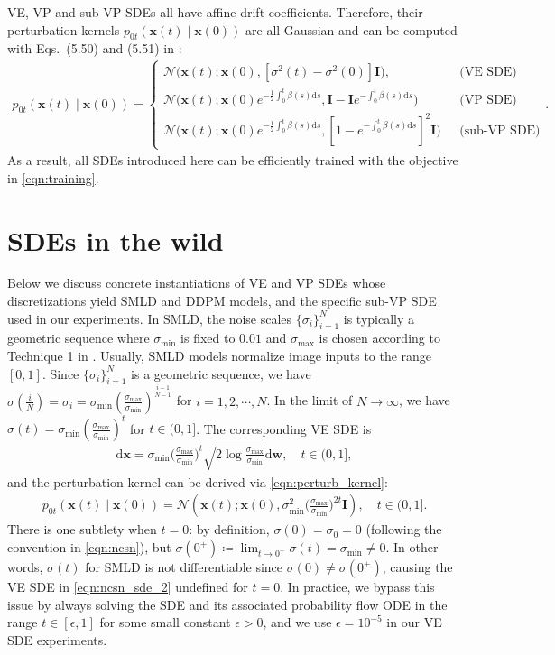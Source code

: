\documentclass{article} %
\newcommand{\ud}{\mathrm{d}}
\newcommand{\mcal}{\mathcal}
\newcommand{\bfx}{\mathbf{x}}
\newcommand{\bfw}{\mathbf{w}}
\newcommand{\bfI}{\mathbf{I}}
\newcommand{\sm}{\sigma_{\text{min}}}
\newcommand{\sM}{\sigma_{\text{max}}}
\begin{document}
VE, VP and sub-VP SDEs all have affine drift coefficients. Therefore, their perturbation kernels $p_{0t}(\bfx(t) \mid \bfx(0))$ are all Gaussian and can be computed with Eqs.~(5.50) and (5.51) in \citet{sarkka2019applied}:
\begin{align}
    p_{0t}(\bfx(t) \mid \bfx(0)) = \begin{cases} 
    \mcal{N}\big(\bfx(t) ; \bfx(0), [\sigma^2(t) - \sigma^2(0)] \bfI\big), &~~~ \text{(VE SDE)}\\
    \mcal{N}\big(\bfx(t) ; \bfx(0)e^{-\frac{1}{2}\int_0^t \beta(s) \ud s}, \bfI - \bfI e^{-\int_0^t \beta(s) \ud s}\big) &~~~ \text{(VP SDE)}\\
    \mcal{N}\big(\bfx(t) ; \bfx(0)e^{-\frac{1}{2}\int_0^t \beta(s) \ud s}, [1 - e^{-\int_0^t \beta(s) \ud s}]^2 \bfI\big) &~~~ \text{(sub-VP SDE)}
    \end{cases}.\label{eqn:perturb_kernel}
\end{align}
As a result, all SDEs introduced here can be efficiently trained with the objective in \cref{eqn:training}.

\section{SDEs in the wild} \label{app:wild_sde}
Below we discuss concrete instantiations of VE and VP SDEs whose discretizations yield SMLD and DDPM models, and the specific sub-VP SDE used in our experiments. In SMLD, the noise scales $\{\sigma_i\}_{i=1}^N$ is typically a geometric sequence where $\sigma_\text{min}$ is fixed to $0.01$ and $\sigma_\text{max}$ is chosen according to Technique 1 in \citet{song2020improved}. Usually, SMLD models normalize image inputs to the range $[0, 1]$. Since $\{\sigma_i\}_{i=1}^N$ is a geometric sequence, we have $\sigma(\frac{i}{N}) = \sigma_i = \sm \left(\frac{\sM}{\sm}\right)^{\frac{i-1}{N-1}}$ for $i=1,2,\cdots, N$. In the limit of $N \to \infty$, we have $\sigma(t) = \sm \left(\frac{\sM}{\sm}\right)^{t}$ for $t \in (0, 1]$. The corresponding VE SDE is
\begin{align}
\ud \bfx = \sm \bigg( \frac{\sM}{\sm} \bigg)^t \sqrt{2 \log \frac{\sM}{\sm}}\ud \bfw, \quad t \in (0, 1],
\end{align}
and the perturbation kernel can be derived via \cref{eqn:perturb_kernel}:
\begin{align}
    p_{0t}(\bfx(t) \mid \bfx(0)) = \mcal{N}\left(\bfx(t) ; \bfx(0), \sm^2 \Big( \frac{\sM}{\sm}\Big)^{2t} \bfI\right), \quad t \in (0, 1].
\end{align}
There is one subtlety when $t=0$: by definition, $\sigma(0) = \sigma_0 = 0$ (following the convention in \cref{eqn:ncsn}), but $\sigma(0^+) \coloneqq \lim_{t \to 0^+} \sigma(t) = \sigma_\text{min} \neq 0$. In other words, $\sigma(t)$ for SMLD is not differentiable since $\sigma(0) \neq \sigma(0^+)$, causing the VE SDE in \cref{eqn:ncsn_sde_2} undefined for $t=0$. In practice, we bypass this issue by always solving the SDE and its associated probability flow ODE in the range $t \in [\epsilon, 1]$ for some small constant $\epsilon > 0$, and we use $\epsilon = 10^{-5}$ in our VE SDE experiments. %
\end{document}
